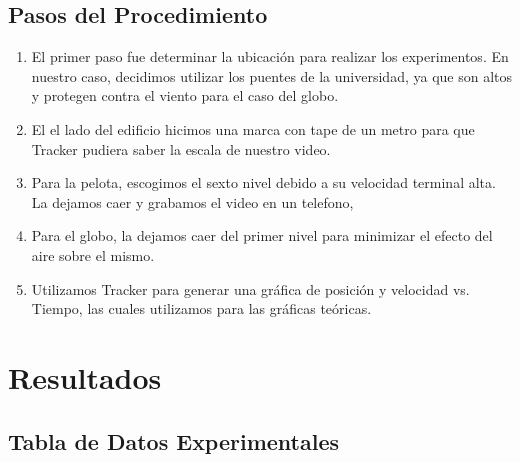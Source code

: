 \documentclass[12pt, journal]{IEEEtran}
\begin{document}
	\subsection{Pasos del Procedimiento}
	\begin{enumerate}
		\item El primer paso fue determinar la ubicación para realizar los experimentos. En nuestro caso, decidimos utilizar los puentes de la universidad, ya que son altos y protegen contra el viento para el caso del globo.
		\item El el lado del edificio hicimos una marca con tape de un metro para que Tracker pudiera saber la escala de nuestro video.
		\item Para la pelota, escogimos el sexto nivel debido a su velocidad terminal alta. La dejamos caer y grabamos el video en un telefono,
		\item Para el globo, la dejamos caer del primer nivel para minimizar el efecto del aire sobre el mismo.
		\item Utilizamos Tracker para generar una gráfica de posición y velocidad vs. Tiempo, las cuales utilizamos para las gráficas teóricas.
	\end{enumerate}

	\section{Resultados}


	\subsection{Tabla de Datos Experimentales}
\end{document}
